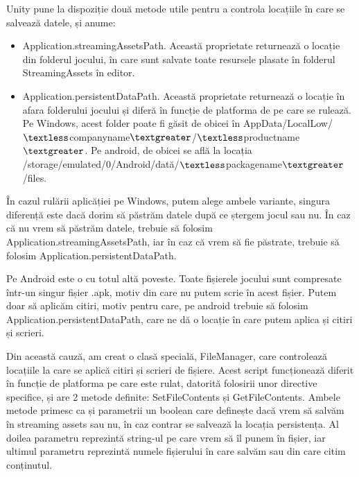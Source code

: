 \documentclass[12pt, a4paper]{article}
\begin{document}
	Unity pune la dispoziție două metode utile pentru a controla locațiile în care se salvează datele, și anume:
	
	\begin{itemize}
		\item Application.streamingAssetsPath. Această proprietate returnează o locație din folderul jocului, în care sunt salvate toate resursele plasate în folderul StreamingAssets în editor.
		\item Application.persistentDataPath. Această proprietate returnează o locație în afara folderului jocului și diferă în funcție de platforma de pe care se rulează. Pe Windows, acest folder poate fi găsit de obicei în \newline AppData/LocalLow/$\textless$companyname$\textgreater$/$\textless$productname$\textgreater$. Pe android, de obicei se află la locația \newline
		/storage/emulated/0/Android/dată/$\textless$packagename$\textgreater$/files.
	\end{itemize}
	
	În cazul rulării aplicăției pe Windows, putem alege ambele variante, singura diferență este dacă dorim să păstrăm datele după ce ștergem jocul sau nu. În caz că nu vrem să păstrăm datele, trebuie să folosim Application.streamingAssetsPath, iar în caz că vrem să fie păstrate, trebuie să folosim Application.persistentDataPath.
	\newline
	
	Pe Android este o cu totul altă poveste. Toate fișierele jocului sunt compresate într-un singur fișier .apk, motiv din care nu putem scrie în acest fișier. Putem doar să aplicăm citiri, motiv pentru care, pe android trebuie să folosim Application.persistentDataPath, care ne dă o locație în care putem aplica și citiri și scrieri.
	\newline
	
	Din această cauză, am creat o clasă specială, FileManager, care controlează locațiile la care se aplică citiri și scrieri de fișiere. Acest script funcționează diferit în funcție de platforma pe care este rulat, datorită folosirii unor directive specifice, și are 2 metode definite: SetFileContents și GetFileContents. Ambele metode primesc ca și parametrii un boolean care definește dacă vrem să salvăm în streaming assets sau nu, în caz contrar se salvează la locația persistența. Al doilea parametru reprezintă string-ul pe care vrem să îl punem în fișier, iar ultimul parametru reprezintă numele fișierului în care salvăm sau din care citim conținutul.
	
\end{document}
